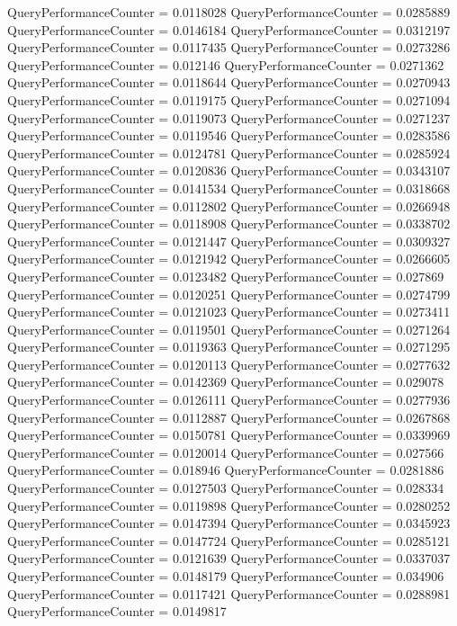 \documentclass[9pt]{article}
\theoremstyle{plain}
\theoremstyle{definition}
\theoremstyle{remark}
\numberwithin{equation}{section}
\begin{document}
QueryPerformanceCounter  =  0.0118028
QueryPerformanceCounter  =  0.0285889
QueryPerformanceCounter  =  0.0146184
QueryPerformanceCounter  =  0.0312197
QueryPerformanceCounter  =  0.0117435
QueryPerformanceCounter  =  0.0273286
QueryPerformanceCounter  =  0.012146
QueryPerformanceCounter  =  0.0271362
QueryPerformanceCounter  =  0.0118644
QueryPerformanceCounter  =  0.0270943
QueryPerformanceCounter  =  0.0119175
QueryPerformanceCounter  =  0.0271094
QueryPerformanceCounter  =  0.0119073
QueryPerformanceCounter  =  0.0271237
QueryPerformanceCounter  =  0.0119546
QueryPerformanceCounter  =  0.0283586
QueryPerformanceCounter  =  0.0124781
QueryPerformanceCounter  =  0.0285924
QueryPerformanceCounter  =  0.0120836
QueryPerformanceCounter  =  0.0343107
QueryPerformanceCounter  =  0.0141534
QueryPerformanceCounter  =  0.0318668
QueryPerformanceCounter  =  0.0112802
QueryPerformanceCounter  =  0.0266948
QueryPerformanceCounter  =  0.0118908
QueryPerformanceCounter  =  0.0338702
QueryPerformanceCounter  =  0.0121447
QueryPerformanceCounter  =  0.0309327
QueryPerformanceCounter  =  0.0121942
QueryPerformanceCounter  =  0.0266605
QueryPerformanceCounter  =  0.0123482
QueryPerformanceCounter  =  0.027869
QueryPerformanceCounter  =  0.0120251
QueryPerformanceCounter  =  0.0274799
QueryPerformanceCounter  =  0.0121023
QueryPerformanceCounter  =  0.0273411
QueryPerformanceCounter  =  0.0119501
QueryPerformanceCounter  =  0.0271264
QueryPerformanceCounter  =  0.0119363
QueryPerformanceCounter  =  0.0271295
QueryPerformanceCounter  =  0.0120113
QueryPerformanceCounter  =  0.0277632
QueryPerformanceCounter  =  0.0142369
QueryPerformanceCounter  =  0.029078
QueryPerformanceCounter  =  0.0126111
QueryPerformanceCounter  =  0.0277936
QueryPerformanceCounter  =  0.0112887
QueryPerformanceCounter  =  0.0267868
QueryPerformanceCounter  =  0.0150781
QueryPerformanceCounter  =  0.0339969
QueryPerformanceCounter  =  0.0120014
QueryPerformanceCounter  =  0.027566
QueryPerformanceCounter  =  0.018946
QueryPerformanceCounter  =  0.0281886
QueryPerformanceCounter  =  0.0127503
QueryPerformanceCounter  =  0.028334
QueryPerformanceCounter  =  0.0119898
QueryPerformanceCounter  =  0.0280252
QueryPerformanceCounter  =  0.0147394
QueryPerformanceCounter  =  0.0345923
QueryPerformanceCounter  =  0.0147724
QueryPerformanceCounter  =  0.0285121
QueryPerformanceCounter  =  0.0121639
QueryPerformanceCounter  =  0.0337037
QueryPerformanceCounter  =  0.0148179
QueryPerformanceCounter  =  0.034906
QueryPerformanceCounter  =  0.0117421
QueryPerformanceCounter  =  0.0288981
QueryPerformanceCounter  =  0.0149817
\end{document}

